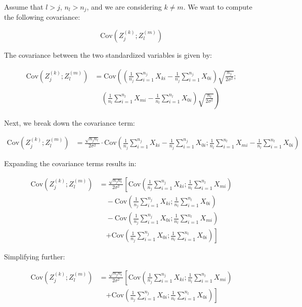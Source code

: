 \documentclass[11pt, a4paper]{article}\usepackage[]{graphicx}\usepackage[]{xcolor}
\begin{document}
Assume that \( l > j \), \( n_l > n_j \), and we are considering \({k \neq m}\). We want to compute the following covariance:

\[
\text{Cov}\left(Z_j^{(k)}; Z_l^{(m)}\right)
\]

The covariance between the two standardized variables is given by:

\begin{align*}
\text{Cov}\left(Z_j^{(k)}; Z_l^{(m)}\right)
& = \text{Cov}\left( \left( \frac{1}{n_j} \sum_{i=1}^{n_j} X_{ki} - \frac{1}{n_j} \sum_{i=1}^{n_j} X_{0i} \right) \sqrt{\frac{n_j}{2\sigma^2}}; \right. \\
& \quad \left. \left( \frac{1}{n_l} \sum_{i=1}^{n_l} X_{mi} - \frac{1}{n_l} \sum_{i=1}^{n_l} X_{0i} \right) \sqrt{\frac{n_l}{2\sigma^2}} \right)
\end{align*}

Next, we break down the covariance term:

\begin{align*}
\text{Cov}\left(Z_j^{(k)}; Z_l^{(m)}\right)
& = \frac{\sqrt{n_j n_l}}{2 \sigma^2} \cdot \text{Cov}\left( \frac{1}{n_j} \sum_{i=1}^{n_j} X_{ki} - \frac{1}{n_j} \sum_{i=1}^{n_j} X_{0i}; \frac{1}{n_l} \sum_{i=1}^{n_l} X_{mi} - \frac{1}{n_l} \sum_{i=1}^{n_l} X_{0i} \right)
\end{align*}

Expanding the covariance terms results in:

\begin{align*}
\text{Cov}\left(Z_j^{(k)}; Z_l^{(m)}\right)
& = \frac{\sqrt{n_j n_l}}{2 \sigma^2} \left[ \text{Cov}\left( \frac{1}{n_j} \sum_{i=1}^{n_j} X_{ki}; \frac{1}{n_l} \sum_{i=1}^{n_l} X_{mi} \right) \right. \\
& \quad - \text{Cov}\left( \frac{1}{n_j} \sum_{i=1}^{n_j} X_{ki}; \frac{1}{n_l} \sum_{i=1}^{n_l} X_{0i} \right) \\
& \quad - \text{Cov}\left( \frac{1}{n_j} \sum_{i=1}^{n_j} X_{0i}; \frac{1}{n_l} \sum_{i=1}^{n_l} X_{mi} \right) \\
& \quad \left. + \text{Cov}\left( \frac{1}{n_j} \sum_{i=1}^{n_j} X_{0i}; \frac{1}{n_l} \sum_{i=1}^{n_l} X_{0i} \right) \right]
\end{align*}

Simplifying further:

\begin{align*}
\text{Cov}\left(Z_j^{(k)}; Z_l^{(m)}\right)
& = \frac{\sqrt{n_j n_l}}{2\sigma^2} \left[ \text{Cov}\left( \frac{1}{n_j} \sum_{i=1}^{n_j} X_{ki}; \frac{1}{n_l} \sum_{i=1}^{n_l} X_{mi} \right) \right. \\
& \quad \left. + \text{Cov}\left( \frac{1}{n_j} \sum_{i=1}^{n_j} X_{0i}; \frac{1}{n_l} \sum_{i=1}^{n_l} X_{0i} \right) \right]
\end{align*}
\end{document}
